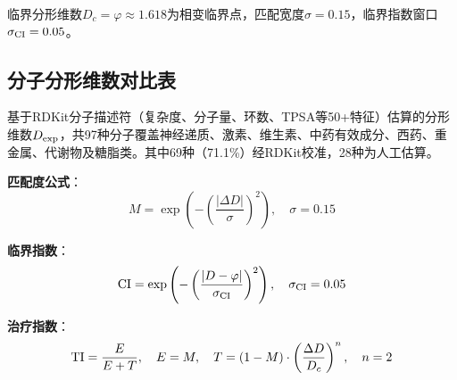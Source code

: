 \documentclass[12pt,a4paper,twocolumn]{article}
\renewcommand{\phi}{\varphi}
\begin{document}
临界分形维数$D_c = \phi \approx 1.618$为相变临界点，匹配宽度$\sigma = 0.15$，临界指数窗口$\sigma_{\rm CI} = 0.05$。

\subsection{分子分形维数对比表}
\label{subsec:molecule_table}

基于RDKit分子描述符（复杂度、分子量、环数、TPSA等50+特征）估算的分形维数$D_{\rm exp}$，共97种分子覆盖神经递质、激素、维生素、中药有效成分、西药、重金属、代谢物及糖脂类。其中69种（71.1\%）经RDKit校准，28种为人工估算。

\textbf{匹配度公式}：
\begin{equation}
M = \exp\left(-\left(\frac{|\Delta D|}{\sigma}\right)^2\right), \quad \sigma = 0.15
\end{equation}

\textbf{临界指数}：
\begin{equation}
{\rm CI} = \exp\left(-\left(\frac{|D - \phi|}{\sigma_{\rm CI}}\right)^2\right), \quad \sigma_{\rm CI} = 0.05
\end{equation}

\textbf{治疗指数}：
\begin{equation}
{\rm TI} = \frac{E}{E + T}, \quad E = M, \quad T = (1-M)\cdot\left(\frac{\Delta D}{D_c}\right)^n, \quad n = 2
\end{equation}
\end{document}
